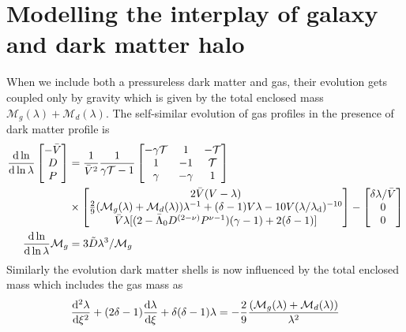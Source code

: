 \section{Modelling the interplay of galaxy and dark matter halo}
\label{sec:methods-interplay-ch:ssr}
When we include both a pressureless dark matter and gas, their evolution gets coupled only by gravity which is given by the total enclosed mass $\mathcal{M}_g(\lambda)+\mathcal{M}_d(\lambda)$. The self-similar evolution of gas profiles in the presence of dark matter profile is
\begin{align}
\label{eq:selfsim-sph_hydro-mat-gasdm-ch:ssr}
\begin{split}
\frac{{\rm d} \ln}{{\rm d} \ln \lambda}
\begin{bmatrix}
 -\bar{V}\\
 D\\
 P
\end{bmatrix} &= \frac{1}{\bar{V}^2} \frac{1}{\gamma \mathcal{T}-1}
\begin{bmatrix}
-\gamma \mathcal{T} & 1 & -\mathcal{T}\\
1 & -1 & \mathcal{T}\\
\gamma & -\gamma & 1
\end{bmatrix}\\
& \times \begin{bmatrix}
 2 \bar{V} (V-\lambda) \\
\frac{2}{9} (\mathcal{M}_g(\lambda)+\mathcal{M}_d(\lambda)) \lambda^{-1} + (\delta -1 ) V \lambda - 10V(\lambda/\lambda_{\rm d})^{-10} \\
 \bar{V} \lambda [(2-\Bar{\Lambda}_0 D^{(2-\nu)} P^{\nu-1})(\gamma - 1) + 2(\delta -1)]
\end{bmatrix} -
\begin{bmatrix}
\delta \lambda/ \bar{V}\\
0\\
0\\
\end{bmatrix}\\
\frac{{\rm d} \ln}{{\rm d} \ln \lambda} \mathcal{M}_g &= 3 \tilde{D} \lambda^{3} /  \mathcal{M}_g \qquad \qquad
\end{split}
\end{align}
Similarly the evolution dark matter shells is now influenced by the total enclosed mass which includes the gas mass as 
\begin{align}
\label{eq:gas-dm-dm-traj-ch:ssr}
\frac{{\rm d}^2 \lambda}{{\rm d} \xi^2} + (2 \delta - 1) \frac{{\rm d} \lambda}{{\rm d}  \xi} + \delta ( \delta -1) \lambda = - \frac{2}{9} \frac{(\mathcal{M}_g(\lambda)+\mathcal{M}_d(\lambda))}{\lambda^2 }
\end{align}

